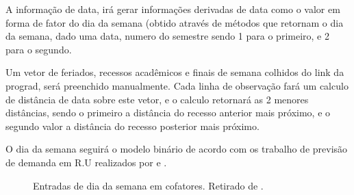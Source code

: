 \documentclass[	12pt, Times, openright, twoside, a4paper, english, brazil]{abntex2}
\begin{document}
	A informação de data, irá gerar informações derivadas de data como o valor em forma de fator do dia da semana (obtido através de métodos que retornam o dia da semana, dado uma data, numero do semestre sendo 1 para o primeiro, e 2 para o segundo.
	
	Um vetor de feriados, recessos acadêmicos e finais de semana colhidos do link da prograd, será preenchido manualmente.
	Cada linha de observação fará um calculo de distância de data sobre este vetor, e o calculo retornará as 2 menores distâncias, sendo o primeiro a distância do recesso anterior mais próximo, e o segundo valor a distância do recesso posterior mais próximo.
	 
	O dia da semana seguirá o modelo binário de acordo com os trabalho de previsão de demanda em R.U realizados por \cite{Lopes2008} e \cite{Rocha2011}.
	
	\begin{figure}[!ht]
		\caption{Entradas de dia da semana em cofatores. Retirado de \cite{Lopes2008}.\label{fig:entradasSemanais}}
	\end{figure}
	
\end{document}
